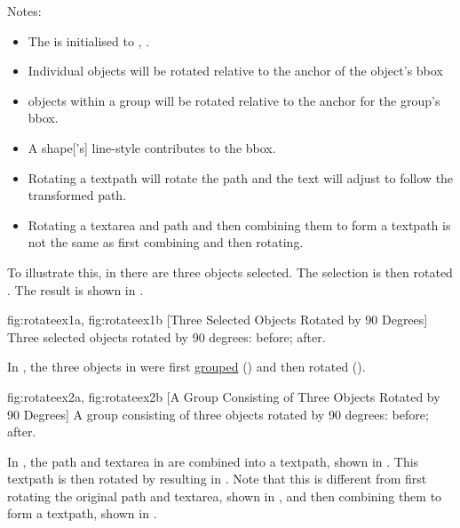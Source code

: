 Notes:
\begin{itemize}
\item The  is initialised to
, .

\item Individual \glspl{object}
will be rotated relative to the anchor of the \gls{object}'s \gls{bbox}

\item \Glspl*{object} within a
\gls{group} will be rotated relative to the anchor for the
group's \gls{bbox}.

\item A \gls*{shape}['s] \gls{line-style} contributes to the \gls{bbox}. 

\item Rotating a \gls{textpath} will rotate the path and the text
will adjust to follow the transformed path.

\item Rotating a \gls*{textarea} and \gls*{path} and then combining
them to form a \gls*{textpath} is not the same as first combining
and then rotating.

\end{itemize}

To illustrate this, in  there are three
\glspl*{object} selected.  The selection is then rotated
.  The result is shown in .

{
 {fig:rotateex1a}{}{},
 {fig:rotateex1b}{}{}
}
[Three Selected Objects Rotated by 90 Degrees]
{Three selected objects rotated by 90 degrees: 
 before;
 after.}

In , the three objects in
 were first \hyperref[sec:grouping]{grouped}
() and then rotated 
().

{
 {fig:rotateex2a}{}{},
 {fig:rotateex2b}{}{}
}
[A Group Consisting of Three Objects Rotated by 90 Degrees]
{A group consisting of three objects rotated by 90 degrees:
 before;  after.}

In , the \gls*{path} and
\gls*{textarea} in  are
combined into a \gls*{textpath}, shown in
. This \gls*{textpath} is then
rotated by  resulting in
. Note that this is different
from first rotating the original \gls*{path} and \gls*{textarea},
shown in , and then combining
them to form a \gls*{textpath}, shown in
.

